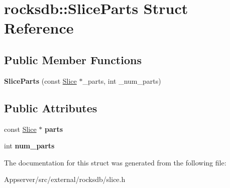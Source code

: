 \hypertarget{structrocksdb_1_1SliceParts}{}\section{rocksdb\+:\+:Slice\+Parts Struct Reference}
\label{structrocksdb_1_1SliceParts}
\subsection*{Public Member Functions}
\begin{DoxyCompactItemize}
\item 
{\bfseries Slice\+Parts} (const \hyperlink{classrocksdb_1_1Slice}{Slice} $\ast$\+\_\+parts, int \+\_\+num\+\_\+parts)\hypertarget{structrocksdb_1_1SliceParts_a771c7260740b0c95cb3a547c3f2ef8b8}{}\label{structrocksdb_1_1SliceParts_a771c7260740b0c95cb3a547c3f2ef8b8}

\end{DoxyCompactItemize}
\subsection*{Public Attributes}
\begin{DoxyCompactItemize}
\item 
const \hyperlink{classrocksdb_1_1Slice}{Slice} $\ast$ {\bfseries parts}\hypertarget{structrocksdb_1_1SliceParts_a0b037fff7894bfb7c0dd154aabad56d8}{}\label{structrocksdb_1_1SliceParts_a0b037fff7894bfb7c0dd154aabad56d8}

\item 
int {\bfseries num\+\_\+parts}\hypertarget{structrocksdb_1_1SliceParts_a2a7f527b0ca122ff6100e32b6271b5be}{}\label{structrocksdb_1_1SliceParts_a2a7f527b0ca122ff6100e32b6271b5be}

\end{DoxyCompactItemize}


The documentation for this struct was generated from the following file\+:\begin{DoxyCompactItemize}
\item 
Appserver/src/external/rocksdb/slice.\+h\end{DoxyCompactItemize}

